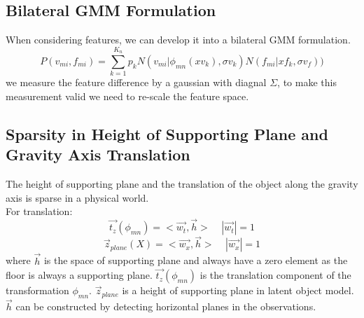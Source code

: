 \subsection{Bilateral GMM Formulation}
When considering features, we can develop it into a bilateral GMM formulation.
\begin{equation}
P(v_{mi},f_{mi})=\sum^{K_n}_{k=1}p_kN(v_{mi}|\phi_{mn}(xv_k),\sigma v_k)N(f_{mi}|xf_k,\sigma v_f))
\end{equation}
we measure the feature difference by a gaussian with diagnal $\Sigma$, to make this measurement valid we need to re-scale the feature space.
\subsection{Sparsity in Height of Supporting Plane and Gravity Axis Translation}
The height of supporting plane and the translation of the object along the gravity axis is sparse in a physical world.\\
For translation:
\begin{equation}
\vec{t_z}(\phi_{mn}) = <\vec{w_t},\vec{h}>~~~~~|\vec{w_t}| = 1
\end{equation}
\begin{equation}
\vec{z}_{plane}(X) = <\vec{w_x},\vec{h}>~~~~~|\vec{w_x}| = 1
\end{equation}
where $\vec{h}$ is the space of supporting plane and always have a zero element as the floor is always a supporting plane. $\vec{t_z}(\phi_{mn})$ is the translation component of the transformation $\phi_{mn}$. $\vec{z}_{plane}$ is a height of supporting plane in latent object model. $\vec{h}$ can be constructed by detecting horizontal planes in the observations.
